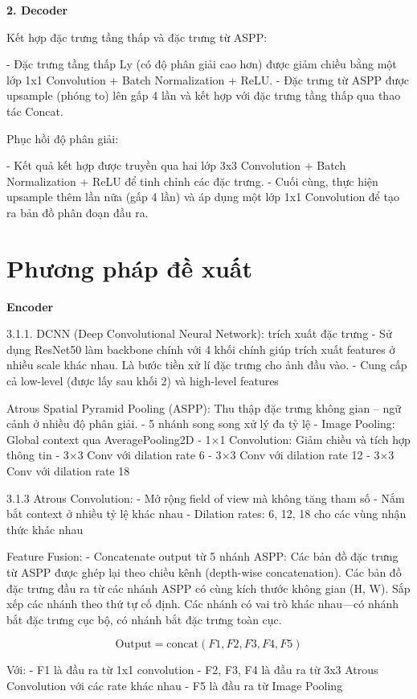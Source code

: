 \documentclass[12pt]{report}
\begin{document}
\textbf{2. Decoder}

Kết hợp đặc trưng tầng thấp và đặc trưng từ ASPP:

- Đặc trưng tầng thấp Ly (có độ phân giải cao hơn) được giảm chiều bằng một lớp 1x1 Convolution + Batch Normalization + ReLU.
- Đặc trưng từ ASPP được upsample (phóng to) lên gấp 4 lần và kết hợp với đặc trưng tầng thấp qua thao tác Concat.

Phục hồi độ phân giải:

- Kết quả kết hợp được truyền qua hai lớp 3x3 Convolution + Batch Normalization + ReLU để tinh chỉnh các đặc trưng.
- Cuối cùng, thực hiện upsample thêm lần nữa (gấp 4 lần) và áp dụng một lớp 1x1 Convolution để tạo ra bản đồ phân đoạn đầu ra.


\chapter*{Phương pháp đề xuất}
\textbf{Encoder}

3.1.1. DCNN (Deep Convolutional Neural Network): trích xuất đặc trưng
- Sử dụng ResNet50 làm backbone chính với 4 khối chính giúp trích xuất features ở nhiều scale khác nhau. Là bước tiền xử lí đặc trưng cho ảnh đầu vào.
- Cung cấp cả low-level (được lấy sau khối 2) và high-level features

Atrous Spatial Pyramid Pooling (ASPP): Thu thập đặc trưng không gian – ngữ cảnh ở nhiều độ phân giải.
- 5 nhánh song song xử lý đa tỷ lệ
    - Image Pooling: Global context qua AveragePooling2D
    - 1$\times$1 Convolution: Giảm chiều và tích hợp thông tin
    - 3$\times$3 Conv với dilation rate 6
    - 3$\times$3 Conv với dilation rate 12
    - 3$\times$3 Conv với dilation rate 18

3.1.3 Atrous Convolution:
- Mở rộng field of view mà không tăng tham số
- Nắm bắt context ở nhiều tỷ lệ khác nhau
- Dilation rates: 6, 12, 18 cho các vùng nhận thức khác nhau

Feature Fusion:
- Concatenate output từ 5 nhánh ASPP: Các bản đồ đặc trưng từ ASPP được ghép lại theo chiều kênh (depth-wise concatenation). Các bản đồ đặc trưng đầu ra từ các nhánh ASPP có cùng kích thước không gian (H, W). Sắp xếp các nhánh theo thứ tự cố định. Các nhánh có vai trò khác nhau—có nhánh bắt đặc trưng cục bộ, có nhánh bắt đặc trưng toàn cục.

\[
\text{Output} = \text{concat}(F1, F2, F3, F4, F5)
\]

Với:
- F1 là đầu ra từ 1x1 convolution
- F2, F3, F4 là đầu ra từ 3x3 Atrous Convolution với các rate khác nhau
- F5 là đầu ra từ Image Pooling
\end{document}
